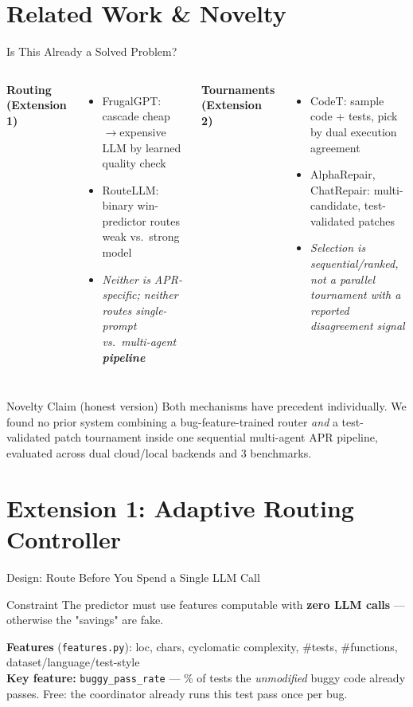 \documentclass[aspectratio=169]{beamer}
\begin{document}
\section{Related Work \& Novelty}
\begin{frame}{Is This Already a Solved Problem?}
\begin{columns}
\textbf{Routing (Extension 1)}
\begin{itemize}
    \item FrugalGPT: cascade cheap$\to$expensive LLM by learned quality check
    \item RouteLLM: binary win-predictor routes weak vs.\ strong model
    \item \emph{Neither is APR-specific; neither routes single-prompt vs.\ multi-agent \textbf{pipeline}}
\end{itemize}
\textbf{Tournaments (Extension 2)}
\begin{itemize}
    \item CodeT: sample code + tests, pick by dual execution agreement
    \item AlphaRepair, ChatRepair: multi-candidate, test-validated patches
    \item \emph{Selection is sequential/ranked, not a parallel tournament with a reported disagreement signal}
\end{itemize}
\end{columns}
\vspace{10pt}
\begin{alertblock}{Novelty Claim (honest version)}
Both mechanisms have precedent individually. We found no prior system combining a bug-feature-trained router \emph{and} a test-validated patch tournament inside one sequential multi-agent APR pipeline, evaluated across dual cloud/local backends and 3 benchmarks.
\end{alertblock}
\end{frame}

\section{Extension 1: Adaptive Routing Controller}
\begin{frame}{Design: Route Before You Spend a Single LLM Call}
\begin{block}{Constraint}
The predictor must use features computable with \textbf{zero LLM calls} --- otherwise the "savings" are fake.
\end{block}
\textbf{Features} (\texttt{features.py}): loc, chars, cyclomatic complexity, \#tests, \#functions, dataset/language/test-style \\[6pt]
\textbf{Key feature:} \texttt{buggy\_pass\_rate} --- \% of tests the \emph{unmodified} buggy code already passes. Free: the coordinator already runs this test pass once per bug.
\end{frame}
\end{document}

